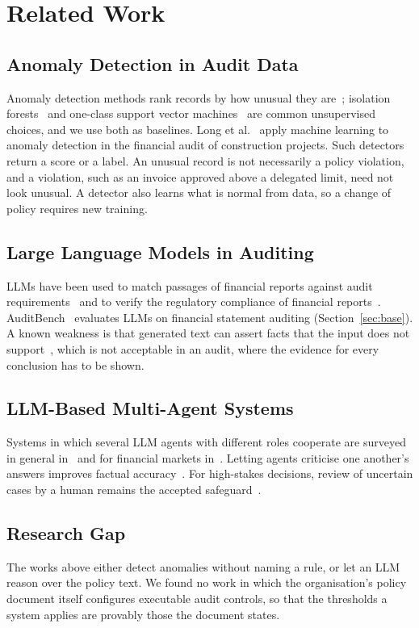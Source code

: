 \documentclass[conference]{IEEEtran}
\begin{document}
\section{Related Work}
\subsection{Anomaly Detection in Audit Data}
Anomaly detection methods rank records by how unusual they are~\cite{chandola2009}; isolation forests~\cite{liu2008} and one-class support vector machines~\cite{scholkopf2001} are common unsupervised choices, and we use both as baselines. Long et al.~\cite{long2026} apply machine learning to anomaly detection in the financial audit of construction projects. Such detectors return a score or a label. An unusual record is not necessarily a policy violation, and a violation, such as an invoice approved above a delegated limit, need not look unusual. A detector also learns what is normal from data, so a change of policy requires new training.

\subsection{Large Language Models in Auditing}
LLMs have been used to match passages of financial reports against audit requirements~\cite{hillebrand2023} and to verify the regulatory compliance of financial reports~\cite{berger2023}. AuditBench~\cite{wang2025auditbench} evaluates LLMs on financial statement auditing (Section~\ref{sec:base}). A known weakness is that generated text can assert facts that the input does not support~\cite{ji2023}, which is not acceptable in an audit, where the evidence for every conclusion has to be shown.

\subsection{LLM-Based Multi-Agent Systems}
Systems in which several LLM agents with different roles cooperate are surveyed in general in~\cite{guo2024} and for financial markets in~\cite{liu2026survey}. Letting agents criticise one another's answers improves factual accuracy~\cite{du2024}. For high-stakes decisions, review of uncertain cases by a human remains the accepted safeguard~\cite{mosqueira2023}.

\subsection{Research Gap}
The works above either detect anomalies without naming a rule, or let an LLM reason over the policy text. We found no work in which the organisation's policy document itself configures executable audit controls, so that the thresholds a system applies are provably those the document states.
\end{document}

